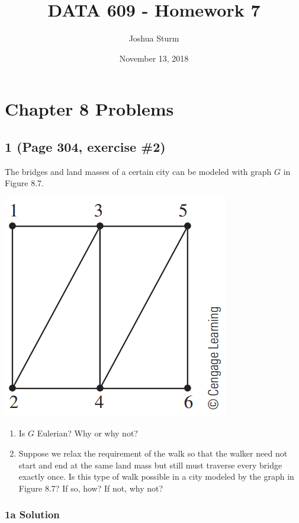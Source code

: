 \documentclass[]{article}
\title{DATA 609 - Homework 7}
\author{Joshua Sturm}
\date{November 13, 2018}
\begin{document}
\maketitle

\hypertarget{chapter-8-problems}{%
\section{Chapter 8 Problems}\label{chapter-8-problems}}

\hypertarget{page-304-exercise-2}{%
\subsection{1 (Page 304, exercise \#2)}\label{page-304-exercise-2}}

The bridges and land masses of a certain city can be modeled with graph
\(G\) in Figure 8.7.

\includegraphics{figure87.png}

\begin{enumerate}
\def\labelenumi{\alph{enumi}.}
\item
  Is \(G\) Eulerian? Why or why not?
\item
  Suppose we relax the requirement of the walk so that the walker need
  not start and end at the same land mass but still must traverse every
  bridge exactly once. Is this type of walk possible in a city modeled
  by the graph in Figure 8.7? If so, how? If not, why not?
\end{enumerate}

\hypertarget{a-solution}{%
\subsubsection{1a Solution}\label{a-solution}}
\end{document}
